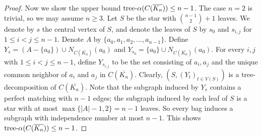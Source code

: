 \documentclass[a4paper, cleveref, autoref, thm-restate]{lipics-v2021}
\newcommand{\T}{\mathcal{T}}
\newcommand{\treea}{{\rm tree}\textnormal{-}\alpha}
\begin{document}
\begin{proof}
    Now we show the upper bound $\treea(C(\overline{K_n})) \leq n-1$.
    The case $n=2$ is trivial, so we may assume $n \geq 3$.
    Let $S$ be the star with $\binom{n-1}{2}+1$ leaves.
    We denote by $s$ the central vertex of $S$, and denote the leaves of $S$ by $s_0$ and $s_{i,j}$ for $1 \leq i <j \leq n-1$.
    Denote $A$ by $\{a_0,a_1,a_2,...,a_{n-1}\}$.
    Define $Y_s = (A-\{a_0\}) \cup N_{C(\overline{K_n})}(a_0)$ and $Y_{s_0} = \{a_0\} \cup N_{C(\overline{K_n})}(a_0)$.
    For every $i,j$ with $1 \leq i <j \leq n-1$, define $Y_{s_{i,j}}$ to be the set consisting of $a_i,a_j$ and the unique common neighbor of $a_i$ and $a_j$ in $C(\overline{K_n})$.
    Clearly, $(S,(Y_t)_{t \in V(S)})$ is a tree-decomposition of $C(\overline{K_n})$.
    Note that the subgraph induced by $Y_s$ contains a perfect matching with $n-1$ edges; the subgraph induced by each leaf of $S$ is a star with at most $\max\{|A|-1,2\} = n-1$ leaves.
    So every bag induces a subgraph with independence number at most $n-1$.
    This shows $\treea(C(\overline{K_n})) \leq n-1$.
%    
%    
%
\end{proof}

\end{document}
